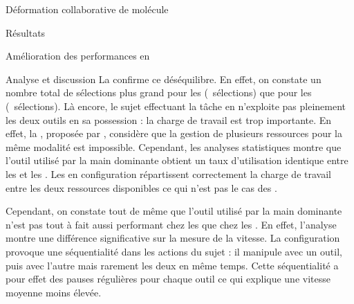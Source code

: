 \documentclass[myfrancais,ngerman,english,frenchb]{mythesis}
\begin{document}
\begin{mychapter}{Déformation collaborative de molécule}
\begin{mysection}{Résultats}
\begin{mysubsection}{Amélioration des performances en }
\begin{mysubsubsection}{Analyse et discussion}
					La  confirme ce déséquilibre.
					En effet, on constate un nombre total de sélections plus grand pour les  (~sélections) que pour les  (~sélections).
					Là encore, le sujet effectuant la tâche en  n'exploite pas pleinement les deux outils en sa possession : la charge de travail est trop importante.
					En effet, la , proposée par , considère que la gestion de plusieurs ressources pour la même modalité est impossible.
					Cependant, les analyses statistiques montre que l'outil utilisé par la main dominante obtient un taux d'utilisation identique entre les  et les .
					Les  en configuration  répartissent correctement la charge de travail entre les deux ressources disponibles ce qui n'est pas le cas des .

					Cependant, on constate tout de même que l'outil utilisé par la main dominante n'est pas tout à fait aussi performant chez les  que chez les .
					En effet, l'analyse montre une différence significative sur la mesure de la vitesse.
					La configuration  provoque une séquentialité dans les actions du sujet : il manipule avec un outil, puis avec l'autre mais rarement les deux en même temps.
					Cette séquentialité a pour effet des pauses régulières pour chaque outil ce qui explique une vitesse moyenne moins élevée.


\end{mysubsubsection}
\end{mysubsection}
\end{mysection}
\end{mychapter}
\end{document}
